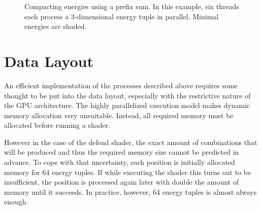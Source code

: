 \begin{figure}[htpb]
\caption{Compacting energies using a prefix sum.
    In this example, six threads each process a 3-dimensional energy tuple in parallel.
    Minimal energies are shaded.}%
\label{fig:compacting}
\end{figure}


\section{Data Layout}\label{sec:data}

An efficient implementation of the processes described above requires some
thought to be put into the data layout,
especially with the restrictive nature of the GPU architecture.
The highly parallelized execution model makes dynamic memory allocation very
unsuitable.
Instead, all required memory must be allocated before running a shader.

However in the case of the defend shader,
the exact amount of combinations that will be produced
and thus the required memory size cannot be predicted in advance.
To cope with that uncertainty,
each position is initially allocated memory for 64 energy tuples.
If while executing the shader this turns out to be insufficient,
the position is processed again later with double the amount of memory
until it succeeds.
In practice, however, 64 energy tuples is almost always enough.

